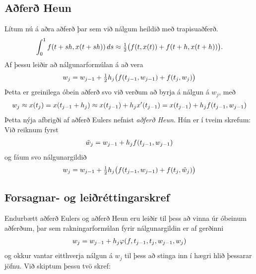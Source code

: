 \documentclass[letterpaper,10pt,icelandic]{sphinxmanual}
\begin{document}
\subsection{Aðferð Heun}
\label{kafli06:index-9}\label{kafli06:afer-heun}
Lítum nú á aðra aðferð þar sem við nálgum heildið með trapisuaðferð.
\begin{gather}
\begin{split}\int_0^1f(t+sh,x(t+sh))\, ds \approx
\tfrac 12 \big(f(t,x(t))+f(t+h,x(t+h))\big).\end{split}\notag
\end{gather}
Af þessu leiðir að nálgunarformúlan á að vera
\begin{gather}
\begin{split}w_j=w_{j-1}+\tfrac 12h_j\big(f(t_{j-1},w_{j-1})+f(t_j,w_j)\big)\end{split}\notag
\end{gather}
Þetta er greinilega óbein aðferð svo við verðum að byrja á nálgun á
\(w_j\), með
\begin{gather}
\begin{split}w_j\approx x(t_j)=x(t_{j-1}+h_j)\approx x(t_{j-1})+h_jx'(t_{j-1})
=x(t_{j-1})+h_jf(t_{j-1},w_{j-1})\end{split}\notag
\end{gather}
Þetta nýja afbrigði af aðferð Eulers nefnist \emph{aðferð Heun}. Hún er í
tveim skrefum: Við reiknum fyrst
\begin{gather}
\begin{split}\tilde w_j = w_{j-1} + h_jf(t_{j-1},w_{j-1})\end{split}\notag
\end{gather}
og fáum svo nálgunargildið
\begin{gather}
\begin{split}w_j = w_{j-1} + \tfrac 12h_j
\big(f(t_{j-1},w_{j-1})+f(t_j,\tilde w_j)\big)\end{split}\notag
\end{gather}

\subsection{Forsagnar- og leiðréttingarskref}
\label{kafli06:index-10}\label{kafli06:forsagnar-og-leirettingarskref}
Endurbætt aðferð Eulers og aðferð Heun eru leiðir til þess að vinna úr
óbeinum aðferðum, þar sem rakningarformúlan fyrir nálgunargildin er af
gerðinni
\begin{gather}
\begin{split}w_j=w_{j-1}+h_j\varphi(f,t_{j-1},t_j,w_{j-1},w_j)\end{split}\notag
\end{gather}
og okkur vantar eitthverja nálgun á \(w_j\) til þess að stinga inn í
hægri hlið þessarar jöfnu. Við skiptum þessu tvö skref:
\end{document}
